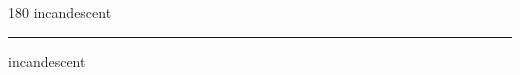 
\begin{frame}
\begin{center}
\begin{turn}{180}
{\fontsize{2.5cm}{1em}\selectfont incandescent}
\end{turn}
\vspace{1em}\par  
\hrule
\vspace{1em}\par  
{\fontsize{2.5cm}{1em}\selectfont incandescent}
\end{center}
\end{frame}
